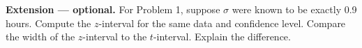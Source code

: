 \documentclass[10pt]{article}
\begin{document}
\begin{extensionbox}
\textbf{Extension --- optional.} For Problem 1, suppose $\sigma$ were known to be
exactly 0.9 hours. Compute the $z$-interval for the same data and confidence level.
Compare the width of the $z$-interval to the $t$-interval. Explain the difference.

\end{extensionbox}
\end{document}
